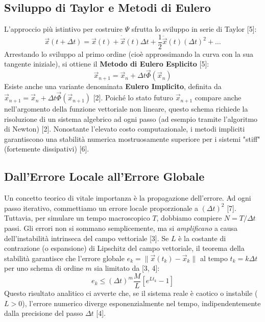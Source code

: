 \documentclass[12pt,a4paper]{article}
\begin{document}
\subsection{Sviluppo di Taylor e Metodi di Eulero}
L'approccio più istintivo per costruire $\Psi$ sfrutta lo sviluppo in serie di Taylor [5]:
\begin{equation}
\vec{x}(t+\Delta t) = \vec{x}(t) + \dot{\vec{x}}(t)\Delta t + \frac{1}{2}\ddot{\vec{x}}(t)(\Delta t)^2 + \dots
\end{equation}
Arrestando lo sviluppo al primo ordine (cioè approssimando la curva con la sua tangente iniziale), si ottiene il \textbf{Metodo di Eulero Esplicito} [5]:
\begin{equation}
\vec{x}_{n+1} = \vec{x}_n + \Delta t \vec{\Phi}(\vec{x}_n)
\end{equation}
Esiste anche una variante denominata \textbf{Eulero Implicito}, definita da $\vec{x}_{n+1} = \vec{x}_n + \Delta t \vec{\Phi}(\vec{x}_{n+1})$ [2]. Poiché lo stato futuro $\vec{x}_{n+1}$ compare anche nell'argomento della funzione vettoriale non lineare, questo schema richiede la risoluzione di un sistema algebrico ad ogni passo (ad esempio tramite l'algoritmo di Newton) [2]. Nonostante l'elevato costo computazionale, i metodi impliciti garantiscono una stabilità numerica mostruosamente superiore per i sistemi "stiff" (fortemente dissipativi) [6].

\subsection{Dall'Errore Locale all'Errore Globale}
Un concetto teorico di vitale importanza è la propagazione dell'errore. Ad ogni passo iterativo, commettiamo un errore locale proporzionale a $(\Delta t)^2$ [7]. Tuttavia, per simulare un tempo macroscopico $T$, dobbiamo compiere $N = T/\Delta t$ passi. Gli errori non si sommano semplicemente, ma si \textit{amplificano} a causa dell'instabilità intrinseca del campo vettoriale [3]. 
Se $L$ è la costante di contrazione (o espansione) di Lipschitz del campo vettoriale, il teorema della stabilità garantisce che l'errore globale $e_k = \|\vec{x}(t_k) - \vec{x}_k\|$ al tempo $t_k = k \Delta t$ per uno schema di ordine $m$ sia limitato da [3, 4]:
\begin{equation}
e_k \le (\Delta t)^m \frac{M}{L} \left[ e^{L t_k} - 1 \right]
\end{equation}
Questo risultato analitico ci avverte che, se il sistema reale è caotico o instabile ($L > 0$), l'errore numerico diverge esponenzialmente nel tempo, indipendentemente dalla precisione del passo $\Delta t$ [4].
\end{document}
